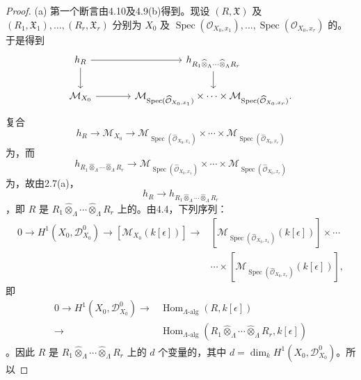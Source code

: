 \begin{proof}
(a) 第一个断言由4.10及4.9(b)得到。现设 $(R,\mathfrak X)$ 及 $(R_1,\mathfrak X_1),\ldots,(R_r,\mathfrak X_r)$ 分别为 $X_0$ 及 $\operatorname{Spec}(\mathcal O_{X_0,x_1}),\ldots,\operatorname{Spec}(\mathcal O_{X_0,x_r})$ 的。于是得到
\[
\begin{tikzcd}[column sep=large]
h_R\arrow[r]\arrow[d]&h_{R_1\widehat\otimes_\Lambda\cdots\widehat\otimes_\Lambda R_r}\arrow[d]\\
\mathcal M_{X_0}\arrow[r]&
\mathcal M_{\operatorname{Spec}(\widehat{\mathcal O}_{X_0,x_1})}\times\cdots\times
\mathcal M_{\operatorname{Spec}(\widehat{\mathcal O}_{X_0,x_r})}.
\end{tikzcd}
\]
复合
\[
h_R\longrightarrow\mathcal M_{X_0}\longrightarrow
\mathcal M_{\operatorname{Spec}(\widehat{\mathcal O}_{X_0,x_1})}\times\cdots\times
\mathcal M_{\operatorname{Spec}(\widehat{\mathcal O}_{X_0,x_r})}
\]
为，而
\[
h_{R_1\widehat\otimes_\Lambda\cdots\widehat\otimes_\Lambda R_r}\longrightarrow
\mathcal M_{\operatorname{Spec}(\widehat{\mathcal O}_{X_0,x_1})}\times\cdots\times
\mathcal M_{\operatorname{Spec}(\widehat{\mathcal O}_{X_0,x_r})}
\]
为，故由2.7(a)，
\[
h_R\longrightarrow h_{R_1\widehat\otimes_\Lambda\cdots\widehat\otimes_\Lambda R_r}
\]
，即 $R$ 是 $R_1\widehat\otimes_\Lambda\cdots\widehat\otimes_\Lambda R_r$ 上的。由4.4，下列序列：
\[
\begin{aligned}
0\longrightarrow H^1(X_0,\mathcal D^0_{X_0})\longrightarrow
[\mathcal M_{X_0}(k[\epsilon])]\longrightarrow{}&
[\mathcal M_{\operatorname{Spec}(\widehat{\mathcal O}_{X_0,x_1})}(k[\epsilon])]\times\cdots\\
&\cdots\times[\mathcal M_{\operatorname{Spec}(\widehat{\mathcal O}_{X_0,x_r})}(k[\epsilon])],
\end{aligned}
\]
即
\[
\begin{aligned}
0\longrightarrow H^1(X_0,\mathcal D^0_{X_0})\longrightarrow{}
&\operatorname{Hom}_{\Lambda\text{-alg}}(R,k[\epsilon])\\
\longrightarrow{}&\operatorname{Hom}_{\Lambda\text{-alg}}(R_1\widehat\otimes_\Lambda\cdots\widehat\otimes_\Lambda R_r,k[\epsilon])
\end{aligned}
\]
。因此 $R$ 是 $R_1\widehat\otimes_\Lambda\cdots\widehat\otimes_\Lambda R_r$ 上的 $d$ 个变量的，其中 $d=\dim_k H^1(X_0,\mathcal D^0_{X_0})$。所以

\end{proof}
